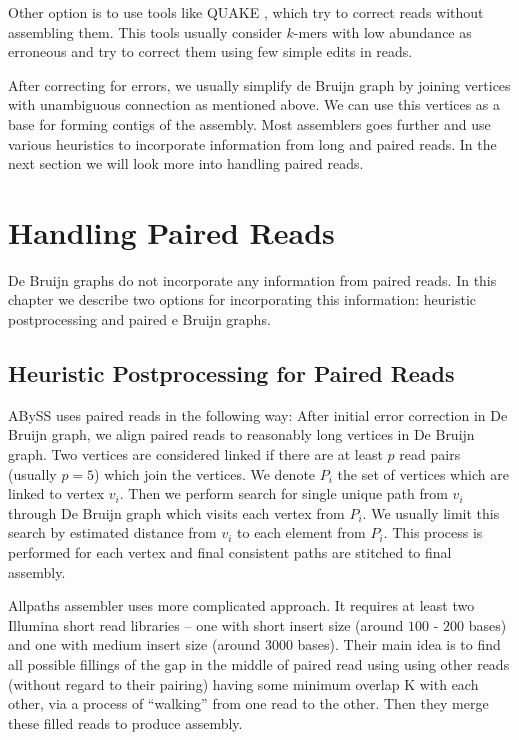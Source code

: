 \bigskip

Other option is to use tools like QUAKE \citep{Quake}, which try to correct reads
without assembling them. This tools usually consider $k$-mers with low abundance
as erroneous and try to correct them using few simple edits in reads.

After correcting for errors, we usually simplify de Bruijn graph by joining vertices
with unambiguous connection as mentioned above. 
We can use this vertices as a base for forming contigs of the assembly.
Most assemblers goes further and use various heuristics
to incorporate information from long and paired reads.
In the next section we will look more into handling paired reads.

\section{Handling Paired Reads}

De Bruijn graphs do not incorporate any information from paired reads.
In this chapter we describe two options for incorporating this information:
heuristic postprocessing and paired e Bruijn graphs.

\subsection{Heuristic Postprocessing for Paired Reads}

ABySS \citep{Abyss} uses paired reads in the following way:
After initial error correction in De Bruijn graph, we align paired reads
to reasonably long vertices in De Bruijn graph. Two vertices are considered linked
if there are at least $p$ read pairs (usually $p=5$) which join the vertices.
We denote $P_i$ the set of vertices which are linked to vertex $v_i$.
Then we perform search for single unique path from $v_i$ through De Bruijn graph which visits
each vertex from $P_i$. We usually limit this search by estimated distance from $v_i$ to each element
from $P_i$. This process is performed for each vertex and final consistent paths
are stitched to final assembly.

Allpaths assembler \citep{allpaths} uses more complicated approach.
It requires at least two Illumina short read libraries -- one with short insert size
(around $100$ - $200$ bases) and one with medium insert size (around $3000$ bases).
Their main idea is to find all possible fillings of the gap in the middle of paired read
using using other reads (without regard to their pairing)
having some minimum overlap K with each other, via a process of “walking” from
one read to the other. Then they merge these filled reads to produce assembly. 

